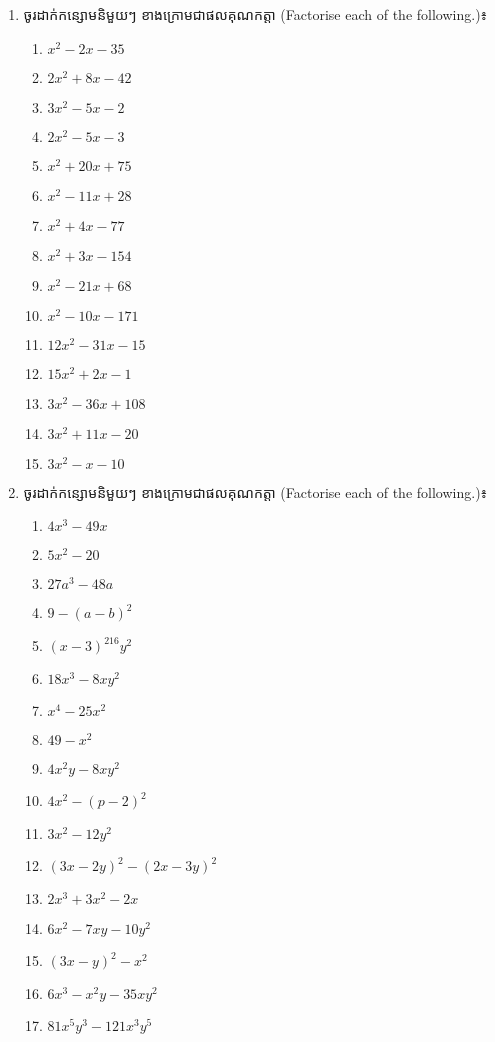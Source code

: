\begin{enumerate}
\item  ចូរដាក់កន្សោមនិមួយៗ ខាងក្រោមជាផលគុណកត្តា (Factorise each of the following.)៖
\begin{multicols}{3}
\begin{enumerate}[label=\alph*.]
\item $x^2-2x-35$
\item $2x^2+8x-42$
\item $3x^2-5x-2$
\item $2x^2-5x-3$
\item $x^2+20x+75$
\item $x^2-11x+28$
\item $x^2+4x-77$
\item $x^2+3x-154$
\item $x^2-21x+68$
\item $x^2-10x-171$
\item $12x^2-31x-15$
\item $15x^2+2x-1$
\item $3x^2-36x+108$
\item $3x^2+11x-20$
\item $3x^2-x-10$
\end{enumerate}
\end{multicols}

\item  ចូរដាក់កន្សោមនិមួយៗ ខាងក្រោមជាផលគុណកត្តា (Factorise each of the following.)៖
\begin{multicols}{3}
\begin{enumerate}[label=\alph*.]
\item $4x^3-49x$
\item $5x^2-20$
\item $27a^3-48a$
\item $9-(a-b)^2$
\item $(x-3)^216y^2$
\item $18x^3-8xy^2$
\item $x^4-25x^2$
\item $49-x^2$
\item $4x^2y-8xy^2$
\item $4x^2-(p-2)^2$
\item $3x^2-12y^2$
\item $(3x-2y)^2-(2x-3y)^2$
\item $2x^3+3x^2-2x$
\item $6x^2-7xy-10y^2$
\item $(3x-y)^2-x^2$
\item $6x^3-x^2y-35xy^2$
\item $81x^5y^3-121x^3y^5$
\end{enumerate}
\end{multicols}


\end{enumerate}
